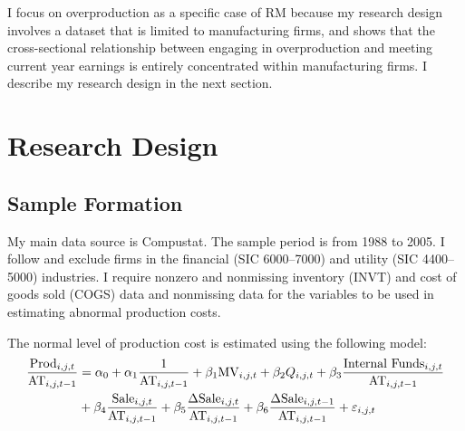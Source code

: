 \documentclass[notitlepage, 12pt]{article}
\begin{document}
\noindent I focus on overproduction as a specific case of RM because my research design involves a dataset that is limited to manufacturing firms, and \citet{roychowdhury:2006} shows that the cross-sectional relationship between engaging in overproduction and meeting current year earnings is entirely concentrated within manufacturing firms. I describe my research design in the next section.

\section{Research Design}\label{researchdesign}
\subsection{Sample Formation}
My main data source is Compustat. The sample period is from 1988 to 2005. I follow \citet{gunny:2010} and exclude firms in the financial (SIC 6000--7000) and utility (SIC 4400--5000) industries. I require nonzero and nonmissing inventory (INVT) and cost of goods sold (COGS) data and nonmissing data for the variables to be used in estimating abnormal production costs. 
\newline

\noindent The normal level of production cost is estimated using the following model:
\begin{align}\label{eq:normprod}
\dfrac{\text{Prod}_{i,j,t}}{\text{AT}_{i,j,t-1}} &= \alpha_{0} + \alpha_{1}\dfrac{1}{\text{AT}_{i,j,t-1}} + \beta_{1}\text{MV}_{i,j,t} + \beta_{2}Q_{i,j,t} + \beta_{3}\dfrac{\text{Internal Funds}_{i,j,t}}{\text{AT}_{i,j,t-1}} \notag \\
&+ \beta_{4}\dfrac{\text{Sale}_{i,j,t}}{\text{AT}_{i,j,t-1}} + \beta_{5}\dfrac{\Delta\text{Sale}_{i,j,t}}{\text{AT}_{i,j,t-1}} + \beta_{6}\dfrac{\Delta\text{Sale}_{i,j,t-1}}{\text{AT}_{i,j,t-1}} + \varepsilon_{i,j,t}
\end{align}
\end{document}
